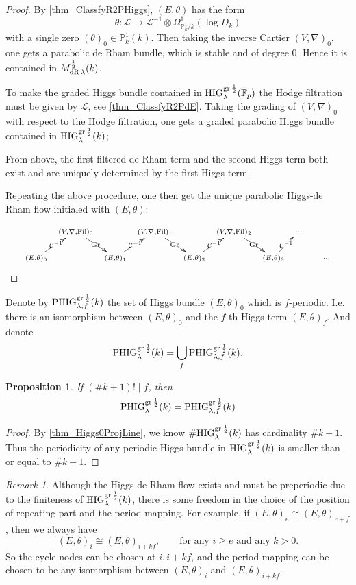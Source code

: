 \documentclass[12pt,twoside]{book}
\theoremstyle{plain}
\newtheorem{proposition}[proposition]{Proposition}
\theoremstyle{definition}
\theoremstyle{remark}
\newtheorem{remark}[remark]{Remark}
\newcommand{\bP}{{\mathbb P}}
\newcommand{\mC}{{\mathcal C}}
\newcommand{\mL}{{\mathcal L}}
\DeclareMathOperator\Fil{Fil}
\numberwithin{equation}{section}
\def\High{{\mathrm{HIG}^{{\rm gr}\,{1\over 2}}_{\lambda}}}
\def\MdRh{{M^{{1\over 2}}_{{\rm dR}\,\lambda}}}
\def\PHigh{{\mathrm{PHIG}^{{\rm gr}\,{1\over 2}}_{\lambda}}}
\def\PHighf{{\mathrm{PHIG}^{{\rm gr}\,{1\over 2}}_{\lambda,f}}}
\def\barFp{{\overline{\mathbb F}_p}}
\begin{document}
\begin{proof}
By \autoref{thm_ClassfyR2PHiggs}, $(E,\theta)$ has the form
\[\theta\colon \mL\rightarrow \mL^{-1}\otimes \Omega^1_{\bP^1_k/k}(\log D_k)\]
with a single zero $(\theta)_0\in \bP^1_k(k)$. Then taking the inverse Cartier $(V,\nabla)_0$, one gets a parabolic de Rham bundle, which is stable and of degree $0$. Hence it is contained in $\MdRh(k)$.

To make the graded Higgs bundle contained in $\High(\barFp)$ the Hodge filtration must be given by $\mL$, see \autoref{thm_ClassfyR2PdE}. Taking the grading of $(V,\nabla)_0$ with respect to the Hodge filtration, one gets a graded parabolic Higgs bundle contained in $\High(k)$;

From above, the first filtered de Rham term and the second Higgs term both exist and are uniquely determined by the first Higgs term.

Repeating the above procedure, one then get the unique parabolic Higgs-de Rham flow initialed with $(E,\theta)$:

\begin{equation*}
\xymatrix@C=2mm@R=5mm{
& {\scriptstyle ( V,\nabla,\Fil)_0} \ar[rd]|{\text{Gr}}
&
& {\scriptstyle ( V,\nabla,\Fil)_1} \ar[rd]|{\text{Gr}}
&
& {\scriptstyle ( V,\nabla,\Fil)_2} \ar[rd]|{\text{Gr}}
&
& {\scriptstyle \cdots}
\\
{\scriptstyle ( E,\theta)_0} \ar[ru]|{\mC^{-1}}
&
& {\scriptstyle ( E,\theta)_1} \ar[ru]|{\mC^{-1}}
&
& {\scriptstyle ( E,\theta)_2} \ar[ru]|{\mC^{-1}}
&
& {\scriptstyle ( E,\theta)_3} \ar[ru]|{\mC^{-1}}
&
& {\scriptstyle \quad \cdots}
}
\end{equation*}
\end{proof}
Denote by $\PHighf(k)$ the set of Higgs bundle $(E,\theta)_0$ which is $f$-periodic. I.e. there is an isomorphism between $(E,\theta)_0$ and the $f$-th Higgs term $(E,\theta)_f$. And denote
\[\PHigh(k) = \bigcup_{f} \PHighf(k).\]

\begin{proposition} \label{mthm_PHIGf2PHIG}
If $(\#k+1)!\mid f$, then
\[\PHigh(k) = \PHighf(k)\]
\end{proposition}
\begin{proof}
By \autoref{thm_Higgs0ProjLine},
we know $\#\High(k)$ has cardinality $\#k+1$. Thus the periodicity of any periodic Higgs bundle in $\High(k)$ is smaller than or equal to $\#k+1$.
\end{proof}

\begin{remark}
Although the Higgs-de Rham flow exists and must be preperiodic due to the finiteness of $\High(k)$, there is some freedom in the choice of the position of repeating part and the period mapping. For example, if $(E,\theta)_e\cong (E,\theta)_{e+f}$, then we always have
\[(E,\theta)_i\cong (E,\theta)_{i+kf},\qquad \text{for any $i\geq e$ and any $k>0$}.\]
So the cycle nodes can be chosen at $i,i+kf$, and the period mapping can be chosen to be any isomorphism between $(E,\theta)_i$ and $(E,\theta)_{i+kf}$.
\end{remark}
\end{document}
